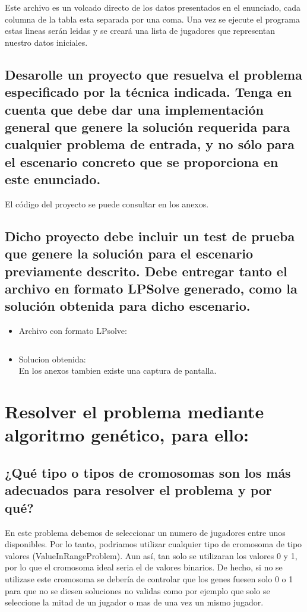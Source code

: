 \documentclass[a4paper,12pt]{article}
\begin{document}
Este archivo es un volcado directo de los datos presentados en el enunciado, cada columna de la tabla esta separada por una coma.
Una vez se ejecute el programa estas lineas serán leidas y se creará una lista de jugadores que representan nuestro datos iniciales.
\subsection{Desarolle un proyecto que resuelva el problema especificado por la técnica indicada.
Tenga en cuenta que debe dar una implementación general que genere la solución requerida para
cualquier problema de entrada, y no sólo para el escenario concreto que se proporciona en este enunciado.}
El código del proyecto se puede consultar en los anexos.

\subsection{Dicho proyecto debe incluir un test de prueba que genere la solución para el escenario previamente descrito.
Debe entregar tanto el archivo en formato LPSolve generado, como la solución obtenida para dicho escenario.}

\begin{itemize}
  \item Archivo con formato LPsolve:
  \inputminted[fontsize=\footnotesize,breaklines]{text}{ArchivoLPSolveGenerado.txt}
  \item Solucion obtenida:
  \\En los anexos tambien existe una captura de pantalla.
\end{itemize}




\section{Resolver el problema mediante algoritmo genético, para ello:}
\subsection{¿Qué tipo o tipos de cromosomas son los más adecuados para resolver el problema y por qué?}
En este problema debemos de seleccionar un numero de jugadores entre unos disponibles.
Por lo tanto, podriamos utilizar cualquier tipo de cromosoma de tipo valores (ValueInRangeProblem).
Aun así, tan solo se utilizaran los valores 0 y 1, por lo que el cromosoma ideal seria el de valores binarios.
De hecho, si no se utilizase este cromosoma se debería de controlar que los genes fuesen solo 0 o 1 para que no
se diesen soluciones no validas como por ejemplo que solo se seleccione la mitad de un jugador o mas de una vez un mismo jugador.
\end{document}
